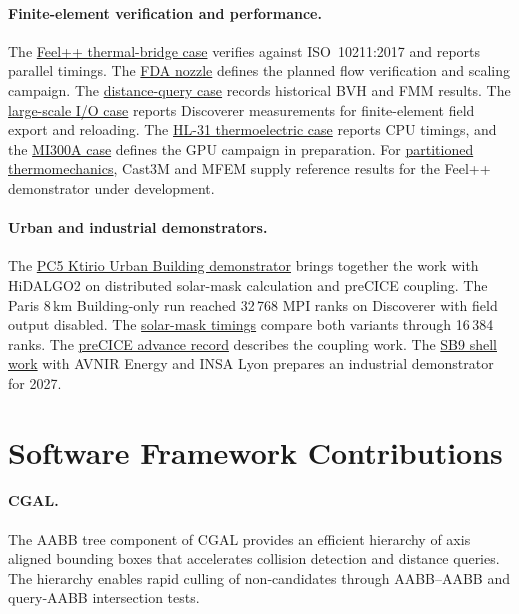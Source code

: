 \paragraph{Finite-element verification and performance.}
The \hyperref[sec:app:specs:app-feelpp-discr-1]{Feel++ thermal-bridge case}
verifies against ISO~10211:2017 and reports parallel timings.
The \hyperref[sec:app:specs:app-feelpp-discr-2]{FDA nozzle} defines the
planned flow verification and scaling campaign. The
\hyperref[sec:app:specs:app-feelpp-distance]{distance-query case} records
historical BVH and FMM results.
The \hyperref[sec:app:specs:app-feelpp-io]{large-scale I/O case} reports
Discoverer measurements for finite-element field export and reloading.
The \hyperref[sec:app:specs:app-feelpp-thermoelectric-1]{HL-31 thermoelectric
case} reports CPU timings, and the
\hyperref[sec:app:specs:app-feelpp-mi300a-fem]{MI300A case} defines the GPU
campaign in preparation.
For \hyperref[sec:app:specs:app-feelpp-thermomeca-1]{partitioned
thermomechanics}, Cast3M and MFEM supply reference results for the Feel++
demonstrator under development.

\paragraph{Urban and industrial demonstrators.}
The \hyperref[sec:pc5:ktirio-urban-building]{PC5 Ktirio Urban Building
demonstrator} brings together the work with HiDALGO2 on distributed
solar-mask calculation and preCICE coupling. The Paris 8\,km Building-only
run reached 32\,768 MPI ranks on Discoverer with field output disabled. The
\hyperref[tab:Feelpp:solar-mask-discoverer]{solar-mask timings}
compare both variants through 16\,384 ranks.
The \hyperref[tab:advance:WP1-A2026-4]{preCICE advance record} describes the
coupling work. The \hyperref[tab:advance:WP1-A2026-2]{SB9 shell work} with
AVNIR Energy and INSA Lyon prepares an industrial demonstrator for 2027.

\section{Software Framework Contributions}



\paragraph{CGAL.} The AABB tree component of CGAL provides an efficient hierarchy of axis aligned bounding boxes that accelerates collision detection and distance queries. The hierarchy enables rapid culling of non‑candidates through AABB–AABB and query‑AABB intersection tests.  

